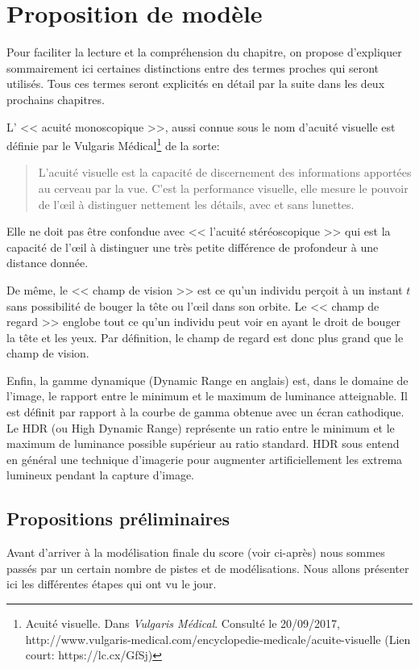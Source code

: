 	\chapter{Proposition de modèle}
	\par Pour faciliter la lecture et la compréhension du chapitre, on propose d'expliquer sommairement ici certaines distinctions entre des termes proches qui seront utilisés. Tous ces termes seront explicités en détail par la suite dans les deux prochains chapitres.

	\par L' << acuité monoscopique >>, aussi connue sous le nom d'acuité visuelle est définie par le Vulgaris Médical\footnote{Acuité visuelle. Dans \textit{Vulgaris Médical}. Consulté le 20/09/2017, http://www.vulgaris-medical.com/encyclopedie-medicale/acuite-visuelle (Lien court: https://lc.cx/GfSj)} de la sorte:
	\begin{quote}
		L'acuité visuelle est la capacité de discernement des informations apportées au cerveau par la vue. C'est la performance visuelle, elle mesure le pouvoir de l'œil à distinguer nettement les détails, avec et sans lunettes.
	\end{quote}
	Elle ne doit pas être confondue avec << l'acuité stéréoscopique >> qui est la capacité de l'œil à distinguer une très petite différence de profondeur à une distance donnée.
	
	\par De même, le << champ de vision >> est ce qu'un individu perçoit à un instant $t$ sans possibilité de bouger la tête ou l'œil dans son orbite. Le << champ de regard >> englobe tout ce qu'un individu peut voir en ayant le droit de bouger la tête et les yeux. Par définition, le champ de regard est donc plus grand que le champ de vision.
	
	\par Enfin, la gamme dynamique (Dynamic Range en anglais) est, dans le domaine de l'image, le rapport entre le minimum et le maximum de luminance atteignable. Il est définit par rapport à la courbe de gamma obtenue avec un écran cathodique. Le HDR (ou High Dynamic Range) représente un ratio entre le minimum et le maximum de luminance possible supérieur au ratio standard. HDR sous entend en général une technique d'imagerie pour augmenter artificiellement les extrema lumineux pendant la capture d'image.
	
	\section{Propositions préliminaires}	
	\par Avant d'arriver à la modélisation finale du score (voir ci-après) nous sommes passés par un certain nombre de pistes et de modélisations. Nous allons présenter ici les différentes étapes qui ont vu le jour.
	
